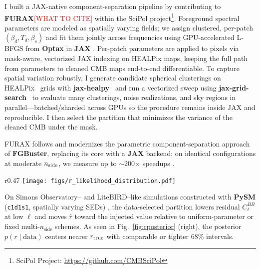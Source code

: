 \documentclass{article}
\newcommand{\wk}[1]{\textcolor{red}{#1}}
\begin{document}
I built a JAX-native component-separation pipeline by contributing to \textbf{FURAX}\wk{[WHAT TO CITE]} within the SciPol project\footnote{SciPol Project: \url{https://github.com/CMBSciPol}}. Foreground spectral parameters are modeled as spatially varying fields; we assign clustered, per-patch \((\beta_d, T_d, \beta_s)\) and fit them jointly across frequencies using GPU-accelerated L-BFGS from \textbf{Optax} \citep{Optax} in \textbf{JAX} \citep{Bradbury2018JAX}. Per-patch parameters are applied to pixels via mask-aware, vectorized JAX indexing on HEALPix maps, keeping the full path from parameters to cleaned CMB maps end-to-end differentiable. To capture spatial variation robustly, I generate candidate spherical clusterings on HEALPix~\citep{Gorski2005,healpy} grids with \textbf{jax-healpy}~\citep{jax-healpy} and run a vectorized sweep using \textbf{jax-grid-search}~\citep{jax-grid-search} to evaluate many clusterings, noise realizations, and sky regions in parallel—batched/sharded across GPUs so the procedure remains inside JAX and reproducible. I then select the partition that minimizes the variance of the cleaned CMB under the mask.

FURAX follows and modernizes the parametric component-separation approach of \textbf{FGBuster}, replacing its core with a \textbf{JAX} backend; on identical configurations at moderate $n_{\rm side}$, we measure up to $\sim$200$\times$ speedups \citep{FGBusterASCL}.

\begin{wrapfigure}[12]{r}{0.47\textwidth} %
  \vspace{-25pt}
  \centering
  \texttt{[image: figs/r\_likelihood\_distribution.pdf]}
  \caption{Posteriors for $r$ across partitionings. The selected spherical clustering shifts $\hat r$ toward the injected value and lowers low-$\ell$ residuals.}\label{fig:rposterior}
\end{wrapfigure}



On Simons Observatory– and LiteBIRD–like simulations \citep{SO2019,LiteBIRD2019} constructed with \textbf{PySM} (\texttt{c1d1s1}, spatially varying SEDs) \citep{PySM}, the data-selected partition lowers residual \(C_\ell^{BB}\) at low \(\ell\) and moves \(\hat r\) toward the injected value relative to uniform-parameter or fixed multi-\(n_{\text{side}}\) schemes. As seen in Fig.~\ref{fig:rposterior} (right), the posterior \(p(r\mid\text{data})\) centers nearer \(r_{\rm true}\) with comparable or tighter 68\% intervals.
\end{document}
